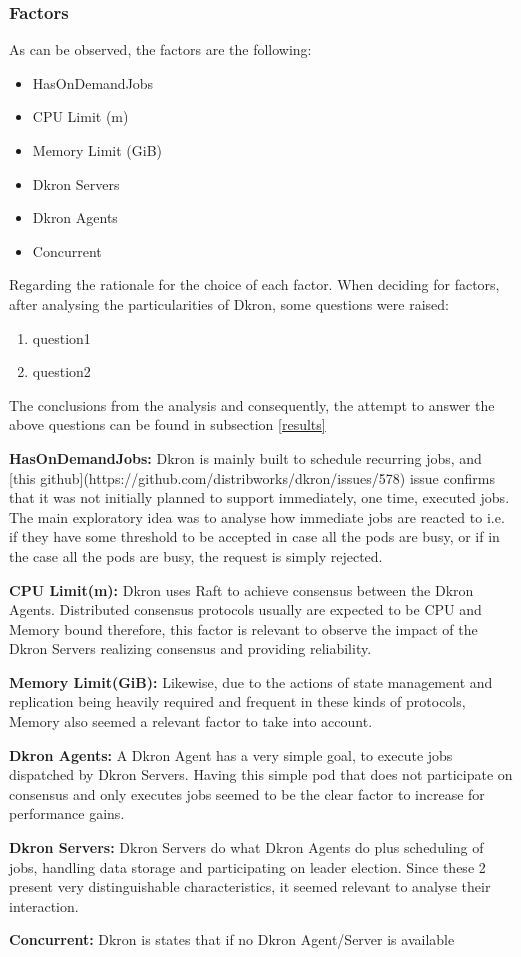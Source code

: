 \documentclass[runningheads]{llncs}
\begin{document}
\subsubsection{Factors}
As can be observed, the factors are the following:
\begin{itemize}
    \item HasOnDemandJobs
    \item CPU Limit (m)
    \item Memory Limit (GiB)
    \item Dkron Servers
    \item Dkron Agents
    \item Concurrent
\end{itemize}

Regarding the rationale for the choice of each factor. When deciding for factors,
after analysing the particularities of Dkron, some questions were raised:
\begin{enumerate}
    \item question1
    \item question2
\end{enumerate}

The conclusions from the analysis and consequently, the attempt to answer the above questions
can be found in subsection \ref{results}

\par \textbf{HasOnDemandJobs:} Dkron is mainly built to schedule recurring jobs,
and [this github](https://github.com/distribworks/dkron/issues/578) issue confirms that it was not initially planned to support immediately,
one time, executed jobs. The main exploratory idea was to analyse how immediate jobs are reacted to
i.e. if they have some threshold to be accepted in case all the pods are busy, or if in the case
all the pods are busy, the request is simply rejected.
\par \textbf{CPU Limit(m):} Dkron uses Raft to achieve consensus between the Dkron Agents.
Distributed consensus protocols usually are expected to be CPU and Memory bound therefore,
this factor is relevant to observe the impact of the Dkron Servers realizing consensus and
providing reliability.
\par \textbf{Memory Limit(GiB):} Likewise, due to the actions of state management and replication
being heavily required and frequent in these kinds of protocols, Memory also seemed a relevant
factor to take into account.
\par \textbf{Dkron Agents:} A Dkron Agent has a very simple goal, to execute jobs dispatched by
Dkron Servers. Having this simple pod that does not participate on consensus and only executes jobs
seemed to be the clear factor to increase for performance gains.
\par \textbf{Dkron Servers:} Dkron Servers do what Dkron Agents do plus scheduling of jobs,
handling data storage and participating on leader election. Since these 2 present very
distinguishable characteristics, it seemed relevant to analyse their interaction.
\par \textbf{Concurrent:} Dkron is states that if no Dkron Agent/Server is available
\end{document}
